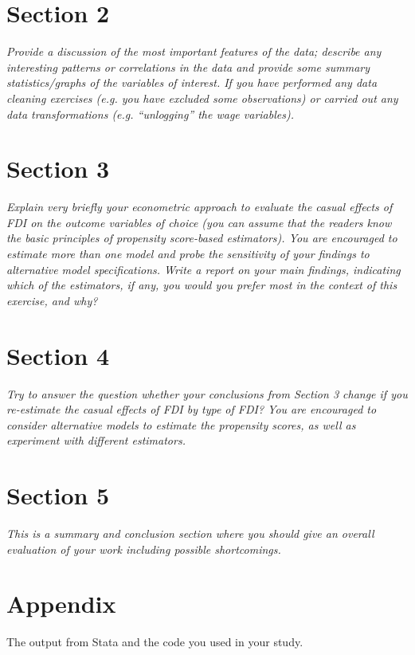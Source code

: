 \documentclass[11pt,a4paper,leqno]{article}
\begin{document}
\section*{Section 2}
\textit{Provide a discussion of the most important features of the data; describe any interesting patterns or correlations in the data and provide some summary statistics/graphs of the variables of interest. If you have performed any data cleaning exercises (e.g. you have excluded some observations) or carried out any data transformations (e.g. “unlogging” the wage variables).}

\section*{Section 3}
\textit{Explain very briefly your econometric approach to evaluate the casual effects of FDI on the outcome variables of choice (you can assume that the readers know the basic principles of propensity score-based estimators). You are encouraged to estimate more than one model and probe the sensitivity of your findings to alternative model specifications. Write a report on your main findings, indicating which of the estimators, if any, you would you prefer most in the context of this exercise, and why?}

\section*{Section 4}
\textit{Try to answer the question whether your conclusions from Section 3 change if you re-estimate the casual effects of FDI by type of FDI? You are encouraged to consider alternative models to estimate the propensity scores, as well as experiment with different estimators.}

\section*{Section 5} 
\textit{This is a summary and conclusion section where you should give an overall evaluation of your work including possible shortcomings.}

\nocite{chen2011}
\clearpage



\appendix
\section*{Appendix}
The output from Stata and the code you used in your study.
\end{document}
